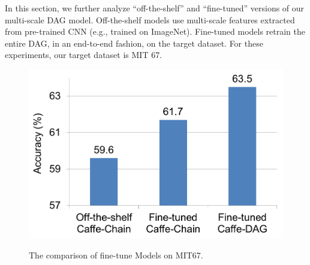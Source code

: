 \documentclass[10pt,twocolumn,letterpaper]{article}
\newcommand{\deva}[1]{\textcolor{red}{[Deva: #1]}}
\begin{document}
In this section, we further analyze ``off-the-shelf'' and ``fine-tuned'' versions of our multi-scale DAG model. Off-the-shelf models use multi-scale features extracted from pre-trained CNN (e.g., trained on ImageNet). Fine-tuned models retrain the entire DAG, in an end-to-end fashion, on the target dataset. For these experiments, our target dataset is MIT 67. 


\begin{figure}[htbp]
\centering
	{\includegraphics[width=.75\columnwidth]{fig/ft_model.png}}

\caption{The comparison of fine-tune Models on MIT67.}
\label{fig:ft_model}
\end{figure}


\end{document}

